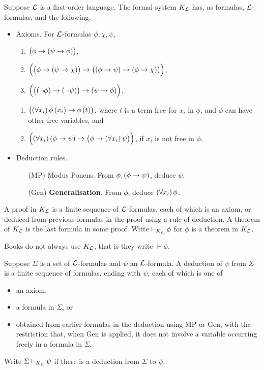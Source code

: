 \begin{definition}
Suppose $ \mathcal{L} $ is a first-order language. The formal system $ K_{\mathcal{L}} $ has, as formulas, $ \mathcal{L} $-formulas, and the following.
\begin{itemize}
\item Axioms. For $ \mathcal{L} $-formulas $ \phi, \chi, \psi $,
\begin{enumerate}[label=(A\arabic*)]
\item $ \impb{\phi}{\impb{\psi}{\phi}} $,
\item $ \impb{\impb{\phi}{\impb{\psi}{\chi}}}{\impb{\impb{\phi}{\psi}}{\impb{\phi}{\chi}}} $,
\item $ \impb{\impb{\notb{\phi}}{\notb{\psi}}}{\impb{\psi}{\phi}} $,
\end{enumerate}
\begin{enumerate}[label=(K\arabic*)]
\item $ \impb{\fab{x_i}\phi\br{x_i}}{\phi\br{t}} $, where $ t $ is a term free for $ x_i $ in $ \phi $, and $ \phi $ can have other free variables, and
\item $ \impb{\fab{x_i}\impb{\phi}{\psi}}{\impb{\phi}{\fab{x_i}\psi}} $, if $ x_i $ is not free in $ \phi $.
\end{enumerate}
\item Deduction rules.
\begin{itemize}
\item[(MP)] Modus Ponens. From $ \phi, \impb{\phi}{\psi} $, deduce $ \psi $.
\item[(Gen)] \textbf{Generalisation}. From $ \phi $, deduce $ \fab{x_i}\phi $.
\end{itemize}
\end{itemize}
A proof in $ K_{\mathcal{L}} $ is a finite sequence of $ \mathcal{L} $-formulas, each of which is an axiom, or deduced from previous formulas in the proof using a rule of deduction. A theorem of $ K_{\mathcal{L}} $ is the last formula in some proof. Write $ \vdash_{K_{\mathcal{L}}} \phi $ for $ \phi $ is a theorem in $ K_{\mathcal{L}} $.
\end{definition}

\begin{note*}
Books do not always use $ K_{\mathcal{L}} $, that is they write $ \vdash \phi $.
\end{note*}

\pagebreak

\begin{definition}
Suppose $ \Sigma $ is a set of $ \mathcal{L} $-formulas and $ \psi $ an $ \mathcal{L} $-formula. A deduction of $ \psi $ from $ \Sigma $ is a finite sequence of formulas, ending with $ \psi $, each of which is one of
\begin{itemize}
\item an axiom,
\item a formula in $ \Sigma $, or
\item obtained from earlier formulas in the deduction using MP or Gen, with the restriction that, when Gen is applied, it does not involve a variable occurring freely in a formula in $ \Sigma $.
\end{itemize}
Write $ \Sigma \vdash_{K_{\mathcal{L}}} \psi $ if there is a deduction from $ \Sigma $ to $ \psi $.
\end{definition}

